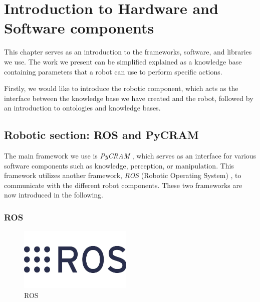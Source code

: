 \chapter{Introduction to Hardware and Software components}
\label{chap:libraries}
This chapter serves as an introduction to the frameworks, software, and libraries we use. The work we present can be simplified explained as a knowledge base containing parameters that a robot can use to perform specific actions.

Firstly, we would like to introduce the robotic component, which acts as the interface between the knowledge base we have created and the robot, followed by an introduction to ontologies and knowledge bases.
\section{Robotic section: ROS and PyCRAM}

The main framework we use is \textit{PyCRAM} \cite{pycram}, which serves as an interface for various software components such as knowledge, perception, or manipulation. 
This framework utilizes another framework, \textit{ROS} (Robotic Operating System) \cite{ros}, to communicate with the different robot components. These two frameworks are now introduced in the following.    
\subsection{ROS}
\label{sec:ROS}
\begin{figure}
	\centering
	\includegraphics[width=0.48\textwidth]{Graphics/ROS.jpg}
	\caption{ROS \cite{ros}}
\end{figure}

